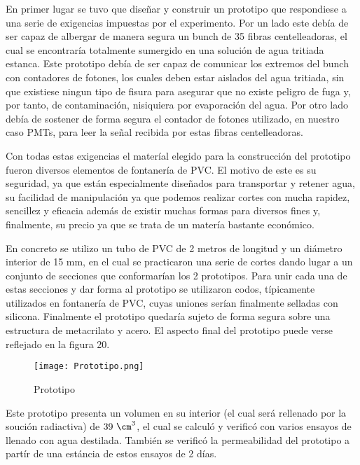 En primer lugar se tuvo que diseñar y construir un prototipo que respondiese a una serie de exigencias impuestas por el experimento. Por un lado este debía de ser capaz de albergar de manera segura  un bunch de 35 fibras centelleadoras, el cual se encontraría totalmente sumergido en una solución de agua tritiada estanca. Este prototipo debía de ser capaz de comunicar los extremos del bunch con contadores de fotones, los cuales deben estar aislados del agua tritiada, sin que existiese ningun tipo de fisura para asegurar que no existe peligro de fuga y, por tanto, de contaminación, nisiquiera por evaporación del agua. Por otro lado debía de sostener de forma segura el contador de fotones utilizado, en nuestro caso PMTs, para leer la señal recibida por estas fibras centelleadoras.

Con todas estas exigencias el materíal elegido para la construcción del prototipo fueron diversos elementos de fontanería de PVC. El motivo de este es su seguridad, ya que están especialmente diseñados para transportar y retener agua, su facilidad de manipulación ya que podemos realizar cortes con mucha rapidez, sencillez y eficacia además de existir muchas formas para diversos fines y, finalmente, su precio ya que se trata de un matería bastante económico. 

En concreto se utilizo un tubo de PVC de 2 metros de longitud y un diámetro interior de 15 mm, en el cual se practicaron una serie de cortes dando lugar a un conjunto de secciones que conformarían los 2 prototipos. Para unir cada una de estas secciones y dar forma al prototipo se utilizaron codos, típicamente utilizados en fontanería de PVC, cuyas uniones serían finalmente selladas con silicona. Finalmente el prototipo quedaría sujeto de forma segura sobre una estructura de metacrilato y acero. El aspecto final del prototipo puede verse reflejado en la figura 20.

\begin{figure}[hbtp]
\centering
\texttt{[image: Prototipo.png]}
\caption{ Prototipo\label{prototipo}}
\end{figure}

Este prototipo presenta un volumen en su interior (el cual será rellenado por la soución radiactiva) de $39~\cm^3$, el cual se calculó y verificó con varios ensayos de llenado con agua destilada. También se verificó la permeabilidad del prototipo a partír de una estáncia de estos ensayos de 2 días. 


